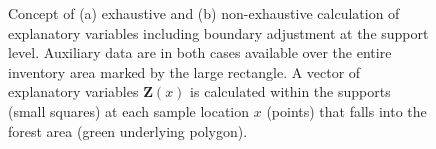 \begin{figure}[htb]
	\begin{subfigure}[t]{0.5\textwidth}
		\centering
		\caption{} \label{fig:exh_nexh_and_boundweights_a}
		\end{subfigure}
	\begin{subfigure}[t]{0.5\textwidth}
		\centering
		\caption{} \label{fig:exh_nexh_and_boundweights_b}
	\end{subfigure}
\caption{Concept of (a) exhaustive and (b) non-exhaustive calculation of explanatory variables including boundary adjustment at the support level. Auxiliary data are in both cases available over the entire inventory area marked by the large rectangle. A vector of explanatory variables $\pmb{Z}(x)$ is calculated within the supports (small squares)  at each sample location $x$ (points) that falls into the forest area (green underlying polygon).}
\label{fig:exh_nexh_bw}
\end{figure}

